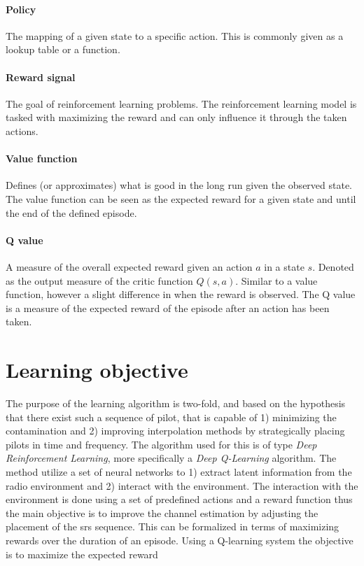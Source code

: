 \paragraph{Policy}
The mapping of a given state to a specific action. This is commonly given as a lookup table or a function.

\paragraph{Reward signal}
The goal of reinforcement learning problems. The reinforcement learning model is tasked with maximizing the reward and can only influence it through the taken actions.

\paragraph{Value function}
Defines (or approximates) what is good in the long run given the observed state. The value function can be seen as the expected reward for a given state and until the end of the defined episode. 

\paragraph{Q value}
A measure of the overall expected reward given an action $a$ in a state $s$. Denoted as the output measure of  the critic function $Q(s, a)$. Similar to a value function, however a slight difference in when the reward is observed. The Q value is a measure of the expected reward of the episode after an action has been taken.


\section{Learning objective}
The purpose of the learning algorithm is two-fold, and based on the hypothesis that there exist such a sequence of pilot, that is capable of 1) minimizing the contamination and 2) improving interpolation methods by strategically placing pilots in time and frequency. The algorithm used for this is of type \emph{Deep Reinforcement Learning}, more specifically a \emph{Deep Q-Learning} algorithm. The method utilize a set of neural networks to 1) extract latent information from the radio environment and 2) interact with the environment. The interaction with the environment is done using a set of predefined actions and a reward function thus the main objective is to improve the channel estimation by adjusting the placement of the \gls{srs} sequence. This can be formalized in terms of maximizing rewards over the duration of an episode. Using a Q-learning system the objective is to maximize the expected reward

